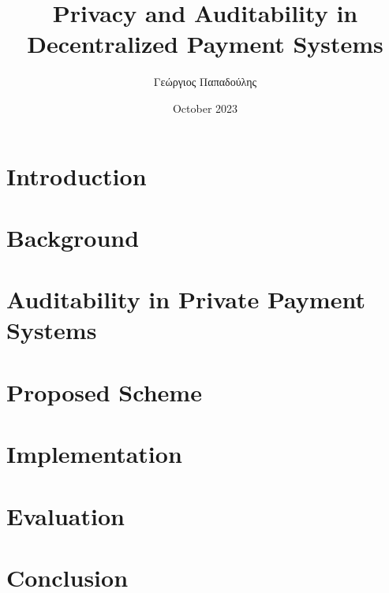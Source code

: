 \documentclass[12pt,a4paper]{book}
\title{Privacy and Auditability in Decentralized Payment Systems}
\author{Γεώργιος Παπαδούλης }
\date{October 2023}
\begin{document}
    
    \tableofcontents
    
    \chapter{Introduction}

    \chapter{Background}
        
        
        
        

    \chapter{Auditability in Private Payment Systems}
    
    

    \chapter{Proposed Scheme}

    \chapter{Implementation}

    \chapter{Evaluation}

    \chapter{Conclusion}

    \printbibliography
\end{document}
